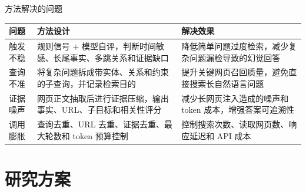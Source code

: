 \documentclass{sintefbeamer}
\newcommand{\tablebody}{\footnotesize\renewcommand{\arraystretch}{1.16}}
\begin{document}








\begin{frame}{方法解决的问题}
  \tablebody
  \begin{tabularx}{\textwidth}{B{2.0cm}YP{4.6cm}}
    \toprule
    问题 & 方法设计 & 解决效果 \\
    \midrule
    触发不稳 & 规则信号 + 模型自评，判断时间敏感、长尾事实、多跳关系和证据缺口 & 降低简单问题过度检索，减少复杂问题漏检导致的幻觉回答 \\
    \addlinespace
    查询不准 & 将复杂问题拆成带实体、关系和约束的子查询，并记录检索目的 & 提升关键网页召回质量，避免直接搜索长自然语言问题 \\
    \addlinespace
    证据噪声 & 网页正文抽取后进行证据压缩，输出事实、URL、子目标和相关性评分 & 减少长网页注入造成的噪声和 token 成本，增强答案可追溯性 \\
    \addlinespace
    调用膨胀 & 查询去重、URL 去重、证据去重、最大轮数和 token 预算控制 & 控制搜索次数、读取网页数、响应延迟和 API 成本 \\
    \bottomrule
  \end{tabularx}
\end{frame}


\section{研究方案}
\end{document}
